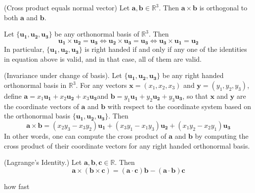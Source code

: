 \documentclass{article}
\begin{document}
\begin{theorem}
    (Cross product equals normal vector)
    Let $\mathbf{a, b}\in\mathbb{R}^3.$ Then $\mathbf{a\times{b}}$ is orthogonal to both $\mathbf{a}$ and $\mathbf{b}$.
\end{theorem}

\begin{theorem}
    Let $\{\mathbf{u_1, u_2, u_3}\}$ be any orthonormal basis of $\mathbb{R}^3$. Then
    $$\mathbf{u_1\times{u_2}=u_3}\Longleftrightarrow\mathbf{u_2\times{u_3}=u_3}\Longleftrightarrow\mathbf{u_3\times{u_1}=u_2}$$
    In particular, $\{\mathbf{u_1, u_2, u_3}\}$ is right handed if and only if any one of the identities in equation above is valid,
    and in that case, all of them are valid.
\end{theorem}

\begin{theorem}
    (Invariance under change of basis).
    Let $\{\mathbf{u_1, u_2, u_3}\}$ be any right handed orthonormal
    basis in $\mathbb{R}^3$. For any vectors $\mathbf{x} = (x_1, x_2, x_3)$ and $\mathbf{y} = (y_1, y_2, y_3)$, define $\mathbf{a} = x_1\mathbf{u_1} + x_2\mathbf{u_2} + x_3\mathbf{u_3}$and $\mathbf{b} = y_1\mathbf{u_1} + y_2\mathbf{u_2} + y_3\mathbf{u_3}$, so that $\mathbf{x}$ and $\mathbf{y}$ are the coordinate vectors of $\mathbf{a}$ and $\mathbf{b}$ with respect to the coordinate system based on the orthonormal basis $\{\mathbf{u_1, u_2, u_3}\}$. Then
    $$\mathbf{a\times{b}}=(x_2y_3-x_3y_2)\mathbf{u_1}+(x_3y_1-x_1y_3)\mathbf{u_2}+(x_1y_2-x_2y_1)\mathbf{u_3}$$
    In other words, one can compute the cross product of $\mathbf{a}$ and $\mathbf{b}$ by computing the cross product of their
    coordinate vectors for any right handed orthonormal basis.
\end{theorem}

\begin{theorem}
    (Lagrange's Identity.) Let $\mathbf{a, b, c} \in \mathbb{R}$. Then $$\mathbf{a} \times (\mathbf{b} \times \mathbf{c})=(\mathbf{a} \cdot \mathbf{c})\mathbf{b} - (\mathbf{a} \cdot \mathbf{b})\mathbf{c}$$
\end{theorem}
how fast
\end{document}
